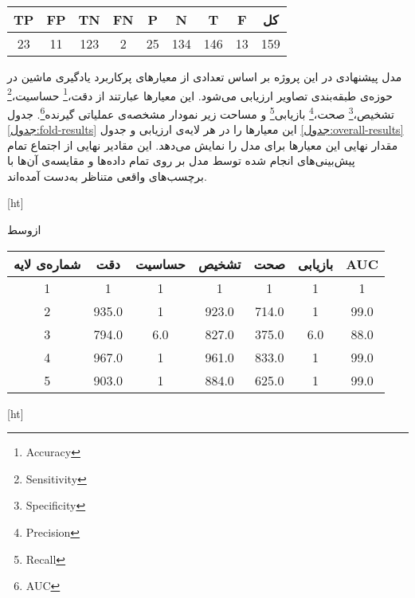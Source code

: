 \begin{tabular}{ccccccccc}
    \hline
     
    TP & FP & TN & FN  & P  & N     & T & F & کل  \\ \hline
    23 & 11 & 123& 2   & 25 & 134   &146& 13& 159\\ \hline
    \end{tabular}




مدل پیشنهادی در این پروژه بر اساس تعدادی از معیار‌های پرکاربرد یادگیری ماشین  
در حوزه‌ی طبقه‌بندی تصاویر 
ارزیابی می‌شود.
این معیارها عبارتند از
 دقت،\footnote{Accuracy}
حساسیت،\footnote{Sensitivity}
تشخیص،\footnote{Specificity}
صحت،\footnote{Precision}
بازیابی\footnote{Recall}
و 
مساحت زیر نمودار مشخصه‌ی عملیاتی گیرنده\footnote{AUC}.
جدول \ref{جدول:fold-results}
این معیار‌ها را در هر لایه‌ی ارزیابی و جدول 
\ref{جدول:overall-results}
مقدار نهایی این معیار‌ها برای مدل را نمایش می‌دهد.
این مقادیر نهایی از اجتماع تمام پیش‌بینی‌های انجام شده توسط مدل بر روی تمام داده‌ها و مقایسه‌ی آن‌ها با برچسب‌های واقعی متناظر به‌دست آمده‌اند.

[ht]

\vspace{1.5em}


‌ازوسط

\begin{tabular}{ccccccc}
    \hline
     
    شماره‌ی لایه & دقت     & حساسیت & تشخیص    & صحت     & بازیابی & AUC \\ \hline
    1           & 1       & 1      & 1         & 1       & 1        & 1   \\ 
    2           & 935.0   & 1      & 923.0     & 714.0   & 1        & 99.0   \\ 
    3           & 794.0   & 6.0    & 827.0     & 375.0   & 6.0      & 88.0   \\ 
    4           & 967.0   & 1      & 961.0     & 833.0   & 1        & 99.0   \\ 
    5           & 903.0   & 1      & 884.0     & 625.0   & 1        & 99.0   \\ \hline
    \end{tabular}


[ht]

